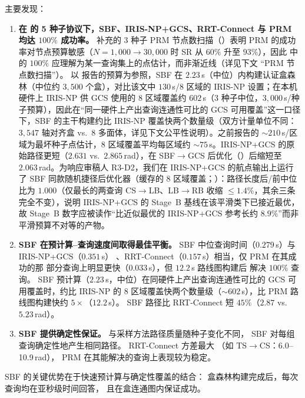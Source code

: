 \documentclass[journal]{IEEEtran}
\begin{document}
主要发现：
\begin{enumerate}[nosep]
  \item \textbf{在  的 5 种子协议下，SBF、IRIS-NP+GCS、RRT-Connect 与 PRM 均达 $100\%$ 成功率。}
    补充的 3 种子 PRM 节点数扫描（）表明 PRM 的成功率对节点预算敏感（$N{=}1{,}000\!\to\!30{,}000$ 时 SR 从 $60\%$ 升至 $93\%$），因此  中的 $100\%$ 应理解为某一查询集上的点估计，而非渐近线（详见下文 ``PRM 节点数扫描''）。
    以 \cite{marcucci2024motion} 报告的预算为参照，SBF 在 $2.23$\,s（中位）内构建认证盒森林（中位约 $3{,}500$ 个盒），对比该文中 $130$\,s/$8$ 区域的 IRIS-NP 设置；在本机硬件上 IRIS-NP 供 GCS 使用的 8 区域覆盖约 $602$\,s（3 种子中位，$3{,}000$\,s/种子预算），因此在“同一硬件上产出查询连通性可比的 GCS 可用覆盖”这一口径下，SBF 的主干构建约比 IRIS-NP 覆盖快两个数量级（双方计量单位不同：$3{,}547$ 轴对齐盒 vs.\ $8$ 多面体，详见下文公平性说明）。之前报告的 ${\sim}210$\,s/区域为最坏种子点估计，8 区域覆盖平均每区域约 ${\sim}75$\,s。IRIS-NP+GCS 的原始路径更短（$2.631$ vs.\ $2.865$\,rad），在 SBF$\to$GCS 后优化（）后缩短至 $2.063$\,rad。为响应审稿人 R3-D2，我们在 IRIS-NP+GCS 的航点输出上运行了 SBF 同款随机捷径后优化器（缓存的 8 区域覆盖；）：路径长度后/前中位比为 $1.000$（仅最长的两查询 CS$\to$LB、LB$\to$RB 收缩 $\le 1.4\%$，其余三条完全不变），说明 IRIS-NP+GCS 的 Stage~B 基线在该平滑类下已接近最优，故 Stage~B 数字应被读作``比近似最优的 IRIS-NP+GCS 参考长约 $8.9\%$''而非平滑预算不对等的产物。

  \item \textbf{SBF 在预计算--查询速度间取得最佳平衡。}
    SBF 中位查询时间（$0.279$\,s）与 IRIS-NP+GCS（$0.351$\,s）
    、RRT-Connect（$0.157$\,s）相当，仅 PRM 在其成功的那
    部分查询上明显更快（$0.033$\,s），但 $12.2$\,s 路线图构建后
    解决 $100\%$ 查询。
    SBF 预计算（$2.23$\,s，中位）在同硬件上产出查询连通性可比的 GCS 可用覆盖时，约比 IRIS-NP 的 8 区域覆盖快两个数量级（${\sim}602$\,s），比 PRM 路线图构建快约 $5{\times}$（$12.2$\,s）。
    SBF 路径比 RRT-Connect 短 $45\%$（$2.87$ vs.\ $5.23$\,rad）。

  \item \textbf{SBF 提供确定性保证。}
    与采样方法路径质量随种子变化不同，
    SBF 对每组查询确定性地产生相同路径。
    RRT-Connect 方差最大
    （如 TS$\to$CS：6.0--10.9\,rad），
    PRM 在其能解决的查询上表现较为稳定。
\end{enumerate}

SBF 的关键优势在于快速预计算与确定性覆盖的结合：
盒森林构建完成后，每次查询均在亚秒级时间回答，
且在盒连通图内保证成功。
\end{document}
